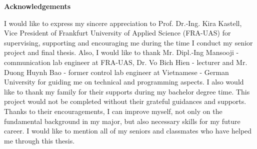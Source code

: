 \begin{center}\textbf{Acknowledgements}\end{center}
{
	\par
	I would like to express my sincere appreciation to Prof. Dr.-Ing. Kira Kastell, Vice President of Frankfurt University of Applied Science (FRA-UAS) for supervising, supporting and encouraging me during the time I conduct my senior project and final thesis. Also, I would like to thank Mr. Dipl.-Ing Mansooji - communication lab engineer at FRA-UAS, Dr. Vo Bich Hien - lecturer and Mr. Duong Huynh Bao - former control lab engineer at Vietnamese - German University for guiding me on technical and programming aspects. I also would like to thank my family for their supports during my bachelor degree time. This project would not be completed without their grateful guidances and supports. Thanks to their encouragements, I can improve myself, not only on the fundamental background in my major, but also necessary skills for my future career. I would like to mention all of my seniors and classmates who have helped me through this thesis.\par
	\vspace{1cm}
}
\cleardoublepage



\renewcommand\contentsname{Table of Contents}
\tableofcontents
\cleardoublepage
{}

\listoftables
\cleardoublepage
{}		%

\listoffigures
\cleardoublepage
{}		%




